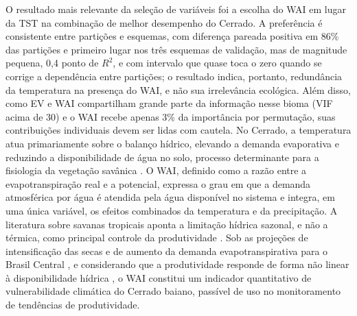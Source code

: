 \documentclass[a4paper,fleqn]{cas-dc}
\begin{document}
O resultado mais relevante da seleção de variáveis foi a escolha do WAI em lugar da TST na combinação de melhor desempenho do Cerrado. A preferência é consistente entre partições e esquemas, com diferença pareada positiva em 86\% das partições e primeiro lugar nos três esquemas de validação, mas de magnitude pequena, 0,4 ponto de $R^2$, e com intervalo que quase toca o zero quando se corrige a dependência entre partições; o resultado indica, portanto, redundância da temperatura na presença do WAI, e não sua irrelevância ecológica. Além disso, como EV e WAI compartilham grande parte da informação nesse bioma (VIF acima de 30) e o WAI recebe apenas 3\% da importância por permutação, suas contribuições individuais devem ser lidas com cautela. No Cerrado, a temperatura atua primariamente sobre o balanço hídrico, elevando a demanda evaporativa e reduzindo a disponibilidade de água no solo, processo determinante para a fisiologia da vegetação savânica \citep{bucci2008,arruda2016}. O WAI, definido como a razão entre a evapotranspiração real e a potencial, expressa o grau em que a demanda atmosférica por água é atendida pela água disponível no sistema e integra, em uma única variável, os efeitos combinados da temperatura e da precipitação. A literatura sobre savanas tropicais aponta a limitação hídrica sazonal, e não a térmica, como principal controle da produtividade \citep{vourlitis2022}. Sob as projeções de intensificação das secas e de aumento da demanda evapotranspirativa para o Brasil Central \citep{ipcc2022}, e considerando que a produtividade responde de forma não linear à disponibilidade hídrica \citep{mwangi2025}, o WAI constitui um indicador quantitativo de vulnerabilidade climática do Cerrado baiano, passível de uso no monitoramento de tendências de produtividade.
\end{document}
